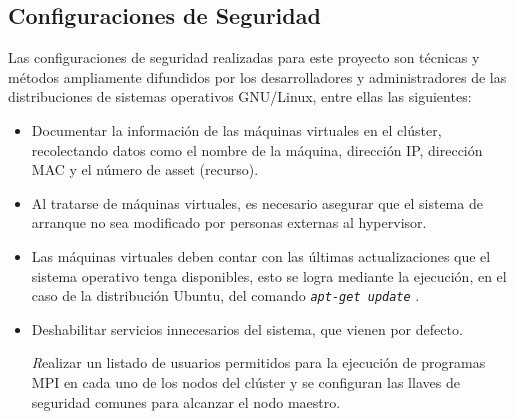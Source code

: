 \documentclass[letterpaper, 12pt, oneside]{article}
\begin{document}
    \subsection{Configuraciones de Seguridad}
    Las configuraciones de seguridad realizadas para este proyecto son técnicas y métodos ampliamente difundidos por los desarrolladores y administradores de las distribuciones de sistemas operativos GNU/Linux\cite{LINUXHARDENING}\cite{LINUXHARDENING2}\cite{LINUXHARDENING3}, entre ellas las siguientes:
    \begin{itemize}
        \item Documentar la información de las máquinas virtuales en el clúster, recolectando datos como el nombre de la máquina, dirección IP, dirección MAC y el número de asset (recurso).
        
        \item Al tratarse de máquinas virtuales, es necesario asegurar que el sistema de arranque no sea modificado por personas externas al hypervisor.
        
        \item Las máquinas virtuales deben contar con las últimas actualizaciones que el sistema operativo tenga disponibles, esto se logra mediante la ejecución, en el caso de la distribución Ubuntu, del comando \textit{ \texttt{apt-get update} }.
        
        \item Deshabilitar servicios innecesarios del sistema, que vienen por defecto.
        
        \textit Realizar un listado de usuarios permitidos para la ejecución de programas MPI en cada uno de los nodos del clúster y se configuran las llaves de seguridad comunes para alcanzar el nodo maestro.
    \end{itemize}
    \newpage
\end{document}
